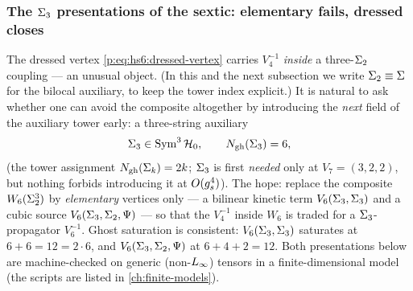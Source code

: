 \subsubsection{The \texorpdfstring{$\Sigma_3$}{Sigma3} presentations of the sextic: elementary
fails, dressed closes}
\label{ped:sec:milestones:sigma3}

The dressed vertex \eqref{p:eq:hs6:dressed-vertex} carries $V_4^{-1}$ \emph{inside} a three-$\Sigma_2$
coupling --- an unusual object. (In this and the next subsection we write $\Sigma_2\equiv\Sigma$
for the bilocal auxiliary, to keep the tower index explicit.) It is natural to ask whether one can
avoid the composite altogether by introducing the \emph{next} field of the auxiliary
tower early: a three-string auxiliary
\begin{equation}
	\Sigma_3\in\operatorname{Sym}^3\mathcal{H}_0,\qquad N_{\text{gh}}(\Sigma_3)=6,
	\label{ped:eq:Sigma3def}
\end{equation}
(the tower assignment $N_{\text{gh}}(\Sigma_k)=2k$; $\Sigma_3$ is first \emph{needed} only at
$V_7=(3{,}2{,}2)$, but nothing forbids introducing it at $O(g_s^4)$). The hope: replace the
composite $W_6(\Sigma_2^3)$ by \emph{elementary} vertices only --- a bilinear kinetic term
$V_6(\Sigma_3,\Sigma_3)$ and a cubic source $V_6(\Sigma_3,\Sigma_2,\Psi)$ --- so that the
$V_4^{-1}$ inside $W_6$ is traded for a $\Sigma_3$-propagator $V_6^{-1}$. Ghost saturation is
consistent: $V_6(\Sigma_3,\Sigma_3)$ saturates at $6{+}6=12=2\cdot6$, and
$V_6(\Sigma_3,\Sigma_2,\Psi)$ at $6{+}4{+}2=12$. Both presentations below are machine-checked
on generic (non-$L_\infty$) tensors in a finite-dimensional model (the scripts are listed in \cref{ch:finite-models}).

